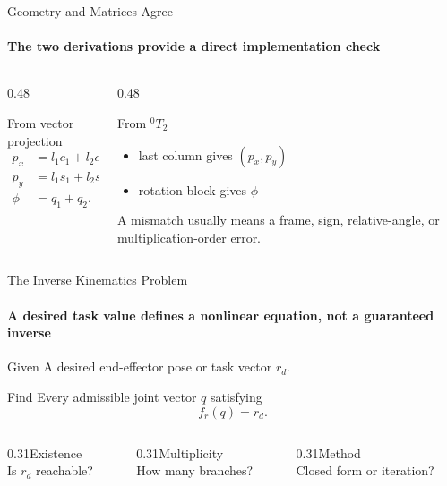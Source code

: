 \documentclass[aspectratio=169]{beamer}
\begin{document}
\begin{frame}[t]{Geometry and Matrices Agree}
    \framesubtitle{The two derivations provide a direct implementation check}
    \begin{columns}[T,onlytextwidth]
        \begin{column}{0.48\textwidth}
            \begin{block}{From vector projection}
                \[
                    \begin{aligned}
                        p_x&=l_1c_1+l_2c_{12},\\
                        p_y&=l_1s_1+l_2s_{12},\\
                        \phi&=q_1+q_2.
                    \end{aligned}
                \]
            \end{block}
        \end{column}
        \begin{column}{0.48\textwidth}
            \begin{block}{From ${}^{0}T_2$}
                \begin{itemize}
                    \item last column gives $(p_x,p_y)$
                    \item rotation block gives $\phi$
                \end{itemize}
            \end{block}
            A mismatch usually means a frame, sign, relative-angle, or multiplication-order error.
        \end{column}
    \end{columns}
\end{frame}

\begin{frame}[t]{The Inverse Kinematics Problem}
    \framesubtitle{A desired task value defines a nonlinear equation, not a guaranteed inverse}
    \begin{block}{Given}
        A desired end-effector pose or task vector $r_d$.
    \end{block}
    \begin{block}{Find}
        Every admissible joint vector $q$ satisfying
        \[
            f_r(q)=r_d.
        \]
    \end{block}
    \begin{columns}[T,onlytextwidth]
        \begin{column}{0.31\textwidth}\centering\Large Existence\\[-1mm]\small Is $r_d$ reachable?\end{column}
        \begin{column}{0.31\textwidth}\centering\Large Multiplicity\\[-1mm]\small How many branches?\end{column}
        \begin{column}{0.31\textwidth}\centering\Large Method\\[-1mm]\small Closed form or iteration?\end{column}
    \end{columns}
\end{frame}
\end{document}
